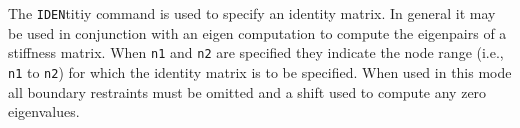 \headb

The {\tt IDEN}titiy command is used to specify an identity
matrix.  In general it may be used in conjunction with an
eigen computation to compute the eigenpairs of a stiffness
matrix.  When {\tt n1} and {\tt n2} are specified they indicate the
node range (i.e., {\tt n1} to {\tt n2}) for which the identity
matrix is to be specified.  When used in this mode all boundary
restraints must be omitted and a shift used to compute any zero eigenvalues.
\vfill\eject
